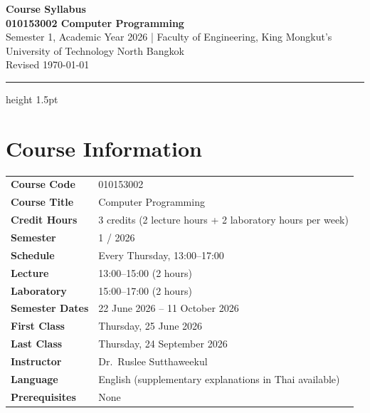 \documentclass[11pt,a4paper]{article}
\begin{document}
\begin{center}
  {\LARGE\bfseries\color{primary} Course Syllabus}\\[6pt]
  {\large\bfseries 010153002 \quad Computer Programming}\\[4pt]
  {\color{muted} Semester 1, Academic Year 2026 \quad|\quad
   Faculty of Engineering, King Mongkut's University of Technology North Bangkok}\\[2pt]
  {\color{muted}\small Revised \today}
\end{center}

\vspace{4pt}
\color{accent}\hrule height 1.5pt\color{black}
\vspace{12pt}

\section{Course Information}

\begin{tabularx}{\textwidth}{@{}lX@{}}
  \textbf{Course Code}      & 010153002 \\[2pt]
  \textbf{Course Title}     & Computer Programming \\[2pt]
  \textbf{Credit Hours}     & 3 credits (2 lecture hours + 2 laboratory hours per week) \\[2pt]
  \textbf{Semester}         & 1 / 2026 \\[2pt]
  \textbf{Schedule}         & Every Thursday, 13:00--17:00 \\[2pt]
  \textbf{Lecture}          & 13:00--15:00 (2 hours) \\[2pt]
  \textbf{Laboratory}       & 15:00--17:00 (2 hours) \\[2pt]
  \textbf{Semester Dates}   & 22 June 2026 -- 11 October 2026 \\[2pt]
  \textbf{First Class}      & Thursday, 25 June 2026 \\[2pt]
  \textbf{Last Class}       & Thursday, 24 September 2026 \\[2pt]
  \textbf{Instructor}       & Dr.\ Ruslee Sutthaweekul \\[2pt]
  \textbf{Language}         & English (supplementary explanations in Thai available) \\[2pt]
  \textbf{Prerequisites}    & None \\[2pt]
\end{tabularx}
\end{document}
